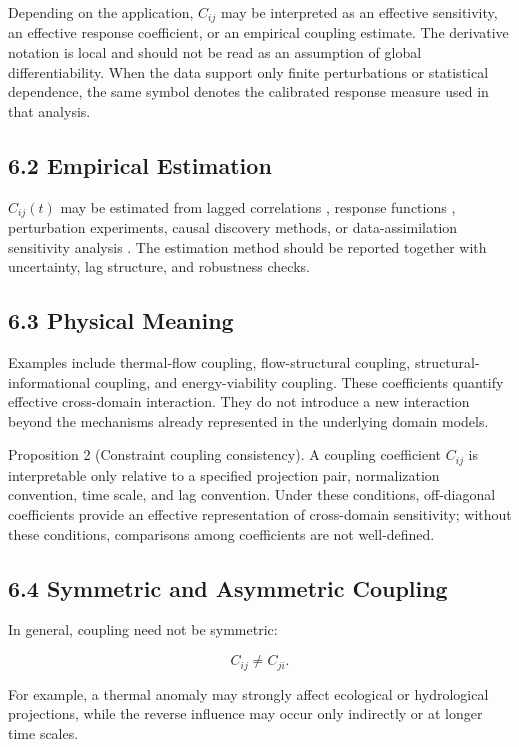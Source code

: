 Depending on the application, \(C_{ij}\) may be interpreted as an effective sensitivity, an effective response coefficient, or an empirical coupling estimate. The derivative notation is local and should not be read as an assumption of global differentiability. When the data support only finite perturbations or statistical dependence, the same symbol denotes the calibrated response measure used in that analysis.

\subsection{6.2 Empirical Estimation}

\(C_{ij}(t)\) may be estimated from lagged correlations \cite{Saltelli2008GSA}, response functions \cite{Saltelli2008GSA}, perturbation experiments, causal discovery methods, or data-assimilation sensitivity analysis \cite{Kalnay2003Assimilation}. The estimation method should be reported together with uncertainty, lag structure, and robustness checks.

\subsection{6.3 Physical Meaning}

Examples include thermal-flow coupling, flow-structural coupling, structural-informational coupling, and energy-viability coupling. These coefficients quantify effective cross-domain interaction. They do not introduce a new interaction beyond the mechanisms already represented in the underlying domain models.

Proposition 2 (Constraint coupling consistency). A coupling coefficient \(C_{ij}\) is interpretable only relative to a specified projection pair, normalization convention, time scale, and lag convention. Under these conditions, off-diagonal coefficients provide an effective representation of cross-domain sensitivity; without these conditions, comparisons among coefficients are not well-defined.

\subsection{6.4 Symmetric and Asymmetric Coupling}

In general, coupling need not be symmetric:

\[ C_{ij}\neq C_{ji}. \]

For example, a thermal anomaly may strongly affect ecological or hydrological projections, while the reverse influence may occur only indirectly or at longer time scales.

